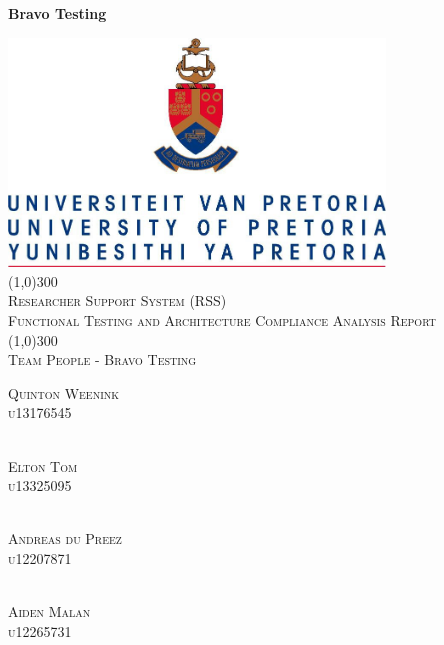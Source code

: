 \documentclass{article}
\begin{document}
	\newpage
	
	\vspace*{\fill}
	\begin{center}
	   	\Huge \textbf{Bravo Testing}
	\end{center}
	\vspace*{\fill}

\begin{titlepage}
	\begin{center}
		\includegraphics[width=10cm]{UP.jpg}  \\
		[1cm]
		\line(1,0){300} \\
		[0.3cm]
		\textsc{\Large
			Researcher Support System (RSS)\\
			Functional Testing and Architecture Compliance Analysis Report
		}\\
		[0.1cm]
		\line(1,0){300} \\
		[0.4cm]
		\textsc{\Large
			Team People - Bravo Testing
		} \\
		
	\end{center}
	\begin{flushright}
		\textsc{\Large
			Quinton Weenink\\ 
			u13176545\\
		}
		
		\textsc{\large\\
			Elton Tom\\ 
			u13325095\\ 
		}
		
		\textsc{\large\\
			Andreas du Preez\\ 
			u12207871\\ 
		}
		
		\textsc{\large\\
			Aiden Malan\\ 
			u12265731\\ 
		}
		
	\end{flushright}
\end{titlepage}
\end{document}
